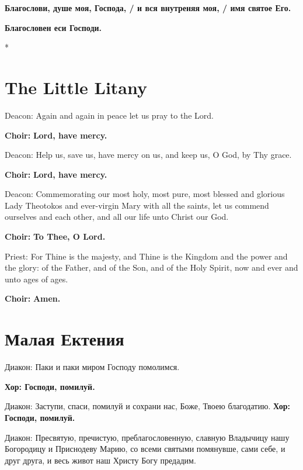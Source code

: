 \documentclass[12pt,a4paper,titlepage]{report}
\begin{document}
\begin{paracol}[1]{2}
	\textbf{Благослови, душе моя, Господа, / и вся внутреняя моя, / имя святое Его.}
	
	\textbf{Благословен еси Господи.}
	
	
	\switchcolumn[0]*
	
	\section*{The Little Litany}
	
	Deacon: Again and again in peace let us pray to the Lord.
	
	\textbf{Choir:} \textbf{Lord, have mercy.}
	
	Deacon: Help us, save us, have mercy on us, and keep us, O God, by Thy grace.
	
	\textbf{Choir:} \textbf{Lord, have mercy.}
	
	Deacon: Commemorating our most holy, most pure, most blessed and glorious Lady Theotokos and ever-virgin Mary with all the saints, let us commend ourselves and each other, and all our life unto Christ our God.
	
	\textbf{Choir:} \textbf{To Thee, O Lord.}
	
	Priest: For Thine is the majesty, and Thine is the Kingdom and the power and the glory: of the Father, and of the Son, and of the Holy Spirit, now and ever and unto ages of ages.
	
	\textbf{Choir:} \textbf{Amen.}
	
	\switchcolumn[1]
	
	\section*{Малая Ектения}
	
	Диакон: Паки и паки миром Господу помолимся.
	
	\textbf{Хор: Господи, помилуй.}
	
	Диакон: Заступи, спаси, помилуй и сохрани нас, Боже, Твоею благодатию.
	\textbf{Хор: Господи, помилуй.}
	
	Диакон: Пресвятую, пречистую, преблагословенную, славную Владычицу нашу Богородицу и Приснодеву Марию, со всеми святыми помянувше, сами себе, и друг друга, и весь живот наш Христу Богу предадим.
	

\end{paracol}
\end{document}
